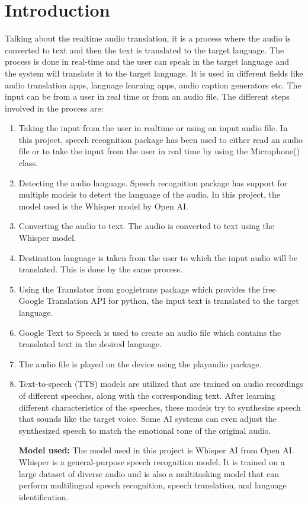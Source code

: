 \documentclass[12px, a4paper]{article}
\begin{document}
\section{Introduction}
Talking about the realtime audio translation, it is a process where the audio is converted to text and then the text is translated to the target language. The process is done in real-time and the user can speak in the target language and the system will translate it to the target language. It is used in different fields like audio translation apps, language learning apps, audio caption generators etc. The input can be from a user in real time or from an audio file. The different steps involved in the process are:
\begin{enumerate}
    \item Taking the input from the user in realtime or using an input audio file. In this project, speech recognition package has been used to either read an audio file or to take the input from the user in real time by using the Microphone() class.
    \item Detecting the audio language. Speech recognition package has support for multiple models to detect the language of the audio. In this project, the model used is the Whisper model by Open AI.
    \item Converting the audio to text. The audio is converted to text using the Whisper model.
    \item Destination language is taken from the user to which the input audio will be translated. This is done by the same process.
    \item Using the Translator from googletrans package which provides the free Google Translation API for python, the input text is translated to the target language.
    \item Google Text to Speech is used to create an audio file which contains the translated text in the desired language.
    \item The audio file is played on the device using the playaudio package.
    \item  Text-to-speech (TTS) models are utilized that are trained on audio recordings of different speeches, along with the corresponding text. After learning different characteristics of the speeches, these models try to synthesize speech that sounds like the target voice. Some AI systems can even adjust the synthesized speech to match the emotional tone of the original audio.
    
    \textbf{Model used:}
    The model used in this project is Whisper AI from Open AI. Whisper is a general-purpose speech recognition model. It is trained on a large dataset of diverse audio and is also a multitasking model that can perform multilingual speech recognition, speech translation, and language identification.
\end{enumerate}
\end{document}
